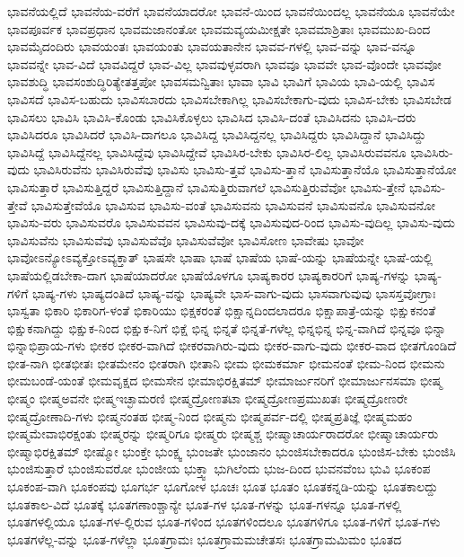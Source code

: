 {ಭಾವನೆಯಲ್ಲಿದೆ
ಭಾವನೆಯ-ವರೆಗೆ
ಭಾವನೆಯಾದರೋ
ಭಾವನೆ-ಯಿಂದ
ಭಾವನೆಯಿಂದಲ್ಲ
ಭಾವನೆಯೂ
ಭಾವನೆಯೇ
ಭಾವಪೂರ್ವಕ
ಭಾವಪ್ರಧಾನ
ಭಾವಮಜಾನಂತೋ
ಭಾವಮವ್ಯಯಮೀಕ್ಷತೇ
ಭಾವಮಾಶ್ರಿತಾಃ
ಭಾವಮುಖ-ದಿಂದ
ಭಾವಮೈದಂದಿರು
ಭಾವಯಂತಃ
ಭಾವಯಂತು
ಭಾವಯತಾನೇನ
ಭಾವವ-ಗಳಲ್ಲಿ
ಭಾವ-ವನ್ನು
ಭಾವ-ವನ್ನೂ
ಭಾವವನ್ನೇ
ಭಾವ-ವಿದೆ
ಭಾವವಿದ್ದರೆ
ಭಾವ-ವಿಲ್ಲ
ಭಾವವುಳ್ಳವರಾಗಿ
ಭಾವವೂ
ಭಾವವೇ
ಭಾವ-ವೊಂದೇ
ಭಾವವೋ
ಭಾವಶುದ್ಧಿ
ಭಾವಸಂಶುದ್ಧಿರಿತ್ಯೇತತ್ತಪೋ
ಭಾವಸಮನ್ವಿತಾಃ
ಭಾವಾ
ಭಾವಿ
ಭಾವಿಗೆ
ಭಾವಿಯ
ಭಾವಿ-ಯಲ್ಲಿ
ಭಾವಿಸ
ಭಾವಿಸದೆ
ಭಾವಿಸ-ಬಹುದು
ಭಾವಿಸಬಾರದು
ಭಾವಿಸಬೇಕಾಗಿಲ್ಲ
ಭಾವಿಸಬೇಕಾಗು-ವುದು
ಭಾವಿಸ-ಬೇಕು
ಭಾವಿಸಬೇಡ
ಭಾವಿಸಲು
ಭಾವಿಸಿ
ಭಾವಿಸಿ-ಕೊಂಡು
ಭಾವಿಸಿಕೊಳ್ಳಲು
ಭಾವಿಸಿದ
ಭಾವಿಸಿ-ದಂತೆ
ಭಾವಿಸಿದನು
ಭಾವಿಸಿ-ದರು
ಭಾವಿಸಿದರೂ
ಭಾವಿಸಿದರೆ
ಭಾವಿಸಿ-ದಾಗಲೂ
ಭಾವಿಸಿದ್ದ
ಭಾವಿಸಿದ್ದನಲ್ಲ
ಭಾವಿಸಿದ್ದರು
ಭಾವಿಸಿದ್ದಾನೆ
ಭಾವಿಸಿದ್ದು
ಭಾವಿಸಿದ್ದೆ
ಭಾವಿಸಿದ್ದೆನಲ್ಲ
ಭಾವಿಸಿದ್ದೆವು
ಭಾವಿಸಿದ್ದೇವೆ
ಭಾವಿಸಿರ-ಬೇಕು
ಭಾವಿಸಿರ-ಲಿಲ್ಲ
ಭಾವಿಸಿರುವವನೂ
ಭಾವಿಸಿರು-ವುದು
ಭಾವಿಸಿರುವೆನು
ಭಾವಿಸಿರುವೆವು
ಭಾವಿಸು
ಭಾವಿಸು-ತ್ತವೆ
ಭಾವಿಸು-ತ್ತಾನೆ
ಭಾವಿಸುತ್ತಾನೆಯೊ
ಭಾವಿಸುತ್ತಾನೆಯೋ
ಭಾವಿಸುತ್ತಾರೆ
ಭಾವಿಸುತ್ತಿದ್ದರೆ
ಭಾವಿಸುತ್ತಿದ್ದಾನೆ
ಭಾವಿಸುತ್ತಿರುವಾಗಲೆ
ಭಾವಿಸುತ್ತಿರುವೆವೋ
ಭಾವಿಸು-ತ್ತೇನೆ
ಭಾವಿಸು-ತ್ತೇವೆ
ಭಾವಿಸುತ್ತೇವೆಯೊ
ಭಾವಿಸುವ
ಭಾವಿಸು-ವಂತೆ
ಭಾವಿಸುವನು
ಭಾವಿಸುವನೆ
ಭಾವಿಸುವನೊ
ಭಾವಿಸುವನೋ
ಭಾವಿಸು-ವರು
ಭಾವಿಸುವರೊ
ಭಾವಿಸುವವನ
ಭಾವಿಸುವು-ದಕ್ಕೆ
ಭಾವಿಸುವುದ-ರಿಂದ
ಭಾವಿಸು-ವುದಿಲ್ಲ
ಭಾವಿಸು-ವುದು
ಭಾವಿಸುವೆನು
ಭಾವಿಸುವೆವು
ಭಾವಿಸುವೆವೊ
ಭಾವಿಸುವೆವೋ
ಭಾವಿಸೋಣ
ಭಾವೇಷು
ಭಾವೋ
ಭಾವೋಽನ್ಯೋಽವ್ಯಕ್ತೋಽವ್ಯಕ್ತಾತ್
ಭಾಷಸೇ
ಭಾಷಾ
ಭಾಷೆ
ಭಾಷೆಯ
ಭಾಷೆ-ಯನ್ನು
ಭಾಷೆಯನ್ನೇ
ಭಾಷೆ-ಯಲ್ಲಿ
ಭಾಷೆಯಲ್ಲಿಡಬೇಕಾ-ದಾಗ
ಭಾಷೆಯಾದರೋ
ಭಾಷೆಯೊಳಗೂ
ಭಾಷ್ಯಕಾರರ
ಭಾಷ್ಯಕಾರರಿಗೆ
ಭಾಷ್ಯ-ಗಳನ್ನು
ಭಾಷ್ಯ-ಗಳಿಗೆ
ಭಾಷ್ಯ-ಗಳು
ಭಾಷ್ಯದಂತಿದೆ
ಭಾಷ್ಯ-ವನ್ನು
ಭಾಷ್ಯವೇ
ಭಾಸ-ವಾಗು-ವುದು
ಭಾಸವಾಗುವುವು
ಭಾಸಸ್ತವೋಗ್ರಾಃ
ಭಾಸ್ವತಾ
ಭಿಕಾರಿ
ಭಿಕಾರಿಗ-ಳಂತೆ
ಭಿಕಾರಿಯು
ಭಿಕ್ಷಕರಂತೆ
ಭಿಕ್ಷಾನ್ನದಿಂದಲಾದರೂ
ಭಿಕ್ಷಾಪಾತ್ರೆ-ಯನ್ನು
ಭಿಕ್ಷುಕನಂತೆ
ಭಿಕ್ಷುಕನಾಗಿದ್ದು
ಭಿಕ್ಷುಕ-ನಿಂದ
ಭಿಕ್ಷುಕ-ನಿಗೆ
ಭಿಕ್ಷೆ
ಭಿನ್ನ
ಭಿನ್ನತೆ
ಭಿನ್ನತೆ-ಗಳೆಲ್ಲ
ಭಿನ್ನಭಿನ್ನ
ಭಿನ್ನ-ವಾಗಿದೆ
ಭಿನ್ನವೂ
ಭಿನ್ನಾ
ಭಿನ್ನಾಭಿಪ್ರಾಯ-ಗಳು
ಭೀಕರ
ಭೀಕರ-ವಾಗಿದೆ
ಭೀಕರವಾಗಿರು-ವುದು
ಭೀಕರ-ವಾಗು-ವುದು
ಭೀಕರ-ವಾದ
ಭೀತಗೊಂಡಿದೆ
ಭೀತ-ನಾಗಿ
ಭೀತಭೀತಃ
ಭೀತಮೇನಂ
ಭೀತರಾಗಿ
ಭೀತಾನಿ
ಭೀಮ
ಭೀಮಕರ್ಮಾ
ಭೀಮನಂತೆ
ಭೀಮ-ನಿಂದ
ಭೀಮನು
ಭೀಮಬಂಡೆ-ಯಂತೆ
ಭೀಮವೃಕ್ಷದ
ಭೀಮಸೇನ
ಭೀಮಾಭಿರಕ್ಷಿತಮ್
ಭೀಮಾರ್ಜುನರಿಗೆ
ಭೀಮಾರ್ಜುನಸಮಾ
ಭೀಷ್ಮ
ಭೀಷ್ಮಂ
ಭೀಷ್ಮಅವನೇ
ಭೀಷ್ಮಇಚ್ಛಾಮರಣಿ
ಭೀಷ್ಮದ್ರೋಣತಟಾ
ಭೀಷ್ಮದ್ರೋಣಪ್ರಮುಖತಃ
ಭೀಷ್ಮದ್ರೋಣರೇ
ಭೀಷ್ಮದ್ರೋಣಾದಿ-ಗಳು
ಭೀಷ್ಮನಂತಹ
ಭೀಷ್ಮ-ನಿಂದ
ಭೀಷ್ಮನು
ಭೀಷ್ಮಪರ್ವ-ದಲ್ಲಿ
ಭೀಷ್ಮಪ್ರತಿಜ್ಞೆ
ಭೀಷ್ಮಮಹಂ
ಭೀಷ್ಮಮೇವಾಭಿರಕ್ಷಂತು
ಭೀಷ್ಮರನ್ನು
ಭೀಷ್ಮರಿಗೂ
ಭೀಷ್ಮರು
ಭೀಷ್ಮಶ್ಚ
ಭೀಷ್ಮಾಚಾರ್ಯರಾದರೋ
ಭೀಷ್ಮಾಚಾರ್ಯರು
ಭೀಷ್ಮಾಭಿರಕ್ಷಿತಮ್
ಭೀಷ್ಮೋ
ಭುಂಕ್ತೇ
ಭುಂಕ್ಷ್ವ
ಭುಂಜತೇ
ಭುಂಜಾನಂ
ಭುಂಜಿಸಬೇಕಾದರೂ
ಭುಂಜಿಸ-ಬೇಕು
ಭುಂಜಿಸಿ
ಭುಂಜಿಸುತ್ತಾರೆ
ಭುಂಜಿಸುವರೋ
ಭುಂಜೀಯ
ಭುಕ್ತ್ವಾ
ಭುಗಿಲೆಂದು
ಭುಜ-ದಿಂದ
ಭುವನವೆಂಬ
ಭುವಿ
ಭೂಕಂಪ
ಭೂಕಂಪ-ವಾಗಿ
ಭೂಕಂಪವು
ಭೂಗರ್ಭ
ಭೂಗೋಳ
ಭೂಚಃ
ಭೂತ
ಭೂತಂ
ಭೂತಕನ್ನಡಿ-ಯನ್ನು
ಭೂತಕಾಲದ್ದು
ಭೂತಕಾಲ-ವಿದೆ
ಭೂತಕ್ಕೆ
ಭೂತಗಣಾಂಶ್ಚಾನ್ಯೇ
ಭೂತ-ಗಳ
ಭೂತ-ಗಳನ್ನು
ಭೂತ-ಗಳನ್ನೂ
ಭೂತ-ಗಳಲ್ಲಿ
ಭೂತಗಳಲ್ಲಿಯೂ
ಭೂತ-ಗಳ-ಲ್ಲಿರುವ
ಭೂತ-ಗಳಿಂದ
ಭೂತಗಳಿಂದಲೂ
ಭೂತಗಳಿಗೂ
ಭೂತ-ಗಳಿಗೆ
ಭೂತ-ಗಳು
ಭೂತಗಳೆಲ್ಲ-ವನ್ನು
ಭೂತ-ಗಳೆಲ್ಲಾ
ಭೂತಗ್ರಾಮಃ
ಭೂತಗ್ರಾಮಮಚೇತಸಃ
ಭೂತಗ್ರಾಮಮಿಮಂ
ಭೂತದ
}
